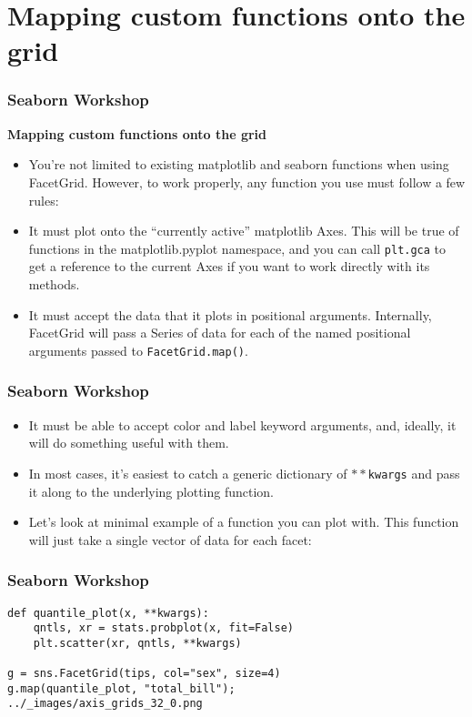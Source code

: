 \documentclass{beamer}
\begin{document}
\section{Mapping custom functions onto the grid}
\begin{frame}[fragile]
\frametitle{Seaborn Workshop}
\large
\noindent \textbf{Mapping custom functions onto the grid}
\begin{itemize}
\item You’re not limited to existing matplotlib and seaborn functions when using FacetGrid. However, to work properly, any function you use must follow a few rules:

\item It must plot onto the “currently active” matplotlib Axes. This will be true of functions in the matplotlib.pyplot namespace, and you can call \texttt{plt.gca} to get a reference to the current Axes if you want to work directly with its methods.
\item It must accept the data that it plots in positional arguments. Internally, FacetGrid will pass a Series of data for each of the named positional arguments passed to \texttt{FacetGrid.map()}.
\end{itemize}

\end{frame}
\begin{frame}[fragile]
\frametitle{Seaborn Workshop}
\large
\begin{itemize}
\item It must be able to accept color and label keyword arguments, and, ideally, it will do something useful with them. 
\item In most cases, it’s easiest to catch a generic dictionary of $\ast \ast$\texttt{kwargs} and pass it along to the underlying plotting function.
\item Let’s look at minimal example of a function you can plot with. This function will just take a single vector of data for each facet:
\end{itemize}
\end{frame}
\begin{frame}[fragile]
	\frametitle{Seaborn Workshop}
	\large
\begin{framed}
\begin{verbatim}
def quantile_plot(x, **kwargs):
    qntls, xr = stats.probplot(x, fit=False)
    plt.scatter(xr, qntls, **kwargs)

g = sns.FacetGrid(tips, col="sex", size=4)
g.map(quantile_plot, "total_bill");
../_images/axis_grids_32_0.png
\end{verbatim}
\end{framed}
\end{frame}
\end{document}
